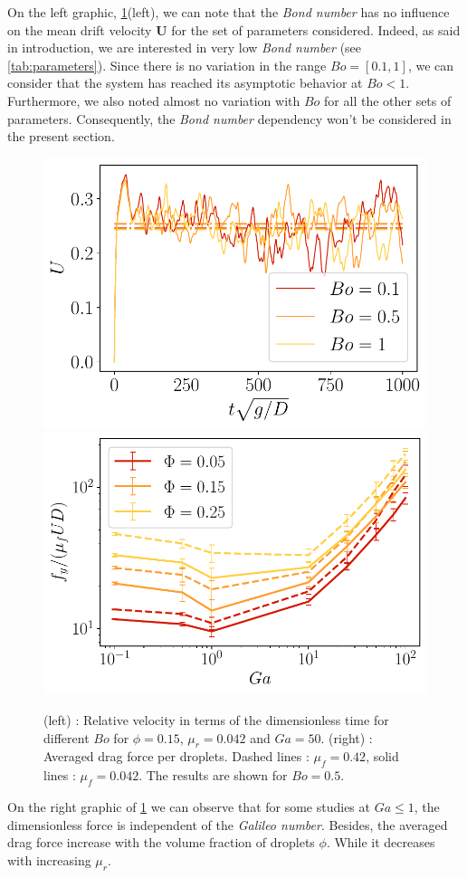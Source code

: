 On the left graphic, \ref{fig:avgF}(left), we can note that the \textit{Bond number} has no influence on the mean drift velocity $\bm{U}$ for the set of parameters considered.
Indeed, as said in introduction, we are interested in very low \textit{Bond number} (see \ref{tab:parameters}).
Since there is no variation in the range $Bo = [0.1,1]$, we can consider that the system has reached its asymptotic behavior at $Bo<1$.
Furthermore, we also noted almost no variation with $Bo$ for all the other sets of parameters.
Consequently, the \textit{Bond number} dependency won't be considered in the present section. 
\begin{figure}[h!]
    \centering
    \includegraphics[height=0.22\textheight]{image/N_10/Favg/Bosdep_Ga_50.pdf}
    \includegraphics[height=0.22\textheight]{image/N_10/Favg/F_mu_Bo_0_5.pdf}
    \caption{(left) : Relative velocity in terms of the dimensionless time for different $Bo$ for $\phi = 0.15$, $\mu_r = 0.042$ and $Ga = 50$. (right) : Averaged drag force per droplets. Dashed lines : $\mu_f = 0.42$, solid lines : $\mu_f = 0.042$. The results are shown for $Bo = 0.5$.} 
    \label{fig:avgF}
\end{figure}
On the right graphic of \ref{fig:avgF} we can observe that for some studies at $Ga\le 1$, the dimensionless force is independent of the  \textit{Galileo number}. 
Besides, the averaged drag force increase with the volume fraction of droplets $\phi$.
While it decreases with increasing $\mu_r$. 

